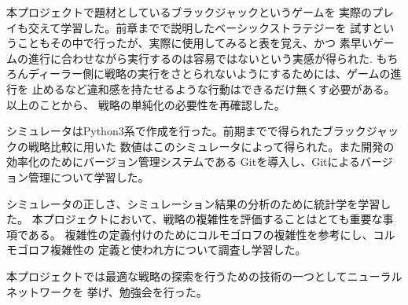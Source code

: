 本プロジェクトで題材としているブラックジャックというゲームを
実際のプレイも交えて学習した。前章までで説明したベーシックストラテジーを
試すということもその中で行ったが、実際に使用してみると表を覚え、かつ
素早いゲームの進行に合わせながら実行するのは容易ではないという実感が得られた.
もちろんディーラー側に戦略の実行をさとられないようにするためには、ゲームの進行を
止めるなど違和感を持たせるような行動はできるだけ無くす必要がある。以上のことから、
戦略の単純化の必要性を再確認した。

シミュレータはPython3系で作成を行った。前期までで得られたブラックジャックの戦略比較に用いた
数値はこのシミュレータによって得られた。また開発の効率化のためにバージョン管理システムである
Gitを導入し、Gitによるバージョン管理について学習した。

シミュレータの正しさ、シミュレーション結果の分析のために統計学を学習した。
本プロジェクトにおいて、戦略の複雑性を評価することはとても重要な事項である。
複雑性の定義付けのためにコルモゴロフの複雑性を参考にし、コルモゴロフ複雑性の
定義と使われ方について調査し学習した。

本プロジェクトでは最適な戦略の探索を行うための技術の一つとしてニューラルネットワークを
挙げ、勉強会を行った。